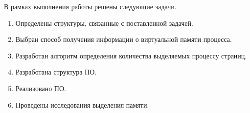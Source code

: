 \Conclusion %

В рамках выполнения работы решены следующие задачи.



\begin{enumerate}
	\item Определены структуры, связанные с поставленной задачей.
	\item Выбран способ получения информации о виртуальной памяти процесса.
	\item Разработан алгоритм определения количества выделяемых процессу страниц.
	\item Разработана структура ПО.
	\item Реализовано ПО.
	\item Проведены исследования выделения памяти.


\end{enumerate}